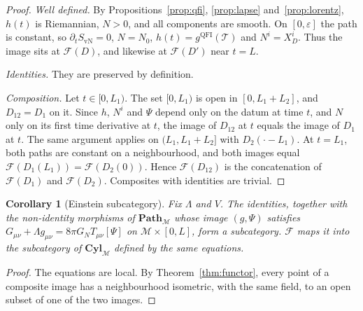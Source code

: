 \documentclass[11pt,a4paper,reqno]{amsart}
\newtheorem{corollary}[theorem]{Corollary}
\theoremstyle{definition}
\numberwithin{equation}{section}
\newcommand{\QFI}{\mathrm{QFI}}
\newcommand{\Path}{\mathbf{Path}_{\mathcal{M}}}
\newcommand{\Cyl}{\mathbf{Cyl}_{\mathcal{M}}}
\begin{document}
\begin{proof}
\emph{Well defined.} By Propositions~\ref{prop:qfi}, \ref{prop:lapse} and~\ref{prop:lorentz}, $h(t)$ is Riemannian, $N>0$, and all components are smooth. On $[0,\varepsilon]$ the path is constant, so $\partial_tS_{\mathrm{vN}}=0$, $N=N_0$, $h(t)=g^{\QFI}(\mathcal{T})$ and $N^i=X_D^i$. Thus the image sits at $\mathcal{F}(D)$, and likewise at $\mathcal{F}(D')$ near $t=L$.

\emph{Identities.} They are preserved by definition.

\emph{Composition.} Let $t\in[0,L_1)$. The set $[0,L_1)$ is open in $[0,L_1+L_2]$, and $D_{12}=D_1$ on it. Since $h$, $N^i$ and $\Psi$ depend only on the datum at time $t$, and $N$ only on its first time derivative at $t$, the image of $D_{12}$ at $t$ equals the image of $D_1$ at $t$. The same argument applies on $(L_1,L_1+L_2]$ with $D_2(\cdot-L_1)$. At $t=L_1$, both paths are constant on a neighbourhood, and both images equal $\mathcal{F}(D_1(L_1))=\mathcal{F}(D_2(0))$. Hence $\mathcal{F}(D_{12})$ is the concatenation of $\mathcal{F}(D_1)$ and $\mathcal{F}(D_2)$. Composites with identities are trivial.
\end{proof}

\begin{corollary}[Einstein subcategory]\label{cor:einstein-sub}
Fix $\Lambda$ and $V$. The identities, together with the non-identity morphisms of $\Path$ whose image $(g,\Psi)$ satisfies $G_{\mu\nu}+\Lambda g_{\mu\nu}=8\pi G_NT_{\mu\nu}[\Psi]$ on $\mathcal{M}\times[0,L]$, form a subcategory. $\mathcal{F}$ maps it into the subcategory of $\Cyl$ defined by the same equations.
\end{corollary}

\begin{proof}
The equations are local. By Theorem~\ref{thm:functor}, every point of a composite image has a neighbourhood isometric, with the same field, to an open subset of one of the two images.
\end{proof}
\end{document}
